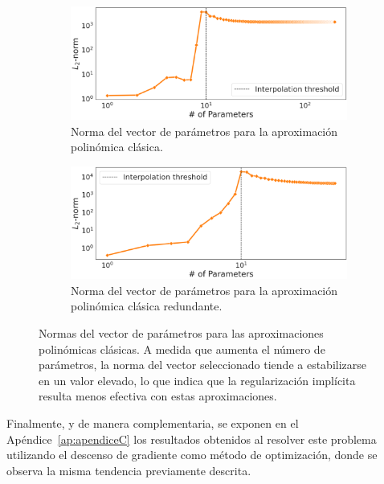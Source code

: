 \begin{figure}[h]
    \centering
    \begin{subfigure}[b]{0.48\textwidth}
        \centering
        \includegraphics[width=\textwidth]{img/experiments/OLS1.4.png}
        \caption{Norma del vector de parámetros para la aproximación polinómica clásica.}\label{fig:OLS1.4DDD}
    \end{subfigure}
    \hfill
    \begin{subfigure}[b]{0.48\textwidth}
        \centering
        \includegraphics[width=\textwidth]{img/experiments/Redundant1.4.png}
        \caption{Norma del vector de parámetros para la aproximación polinómica clásica redundante.}\label{fig:Redundant1.4DDD}
    \end{subfigure}
    \caption[Normas del vector de parámetros para las aproximaciones polinómicas clásicas.]{Normas del vector de parámetros para las aproximaciones polinómicas clásicas. A medida que aumenta el número de parámetros, la norma del vector seleccionado tiende a estabilizarse en un valor elevado, lo que indica que la regularización implícita resulta menos efectiva con estas aproximaciones.}\label{fig:normas-clasicas}
\end{figure}

Finalmente, y de manera complementaria, se exponen en el Apéndice~\ref{ap:apendiceC} los resultados obtenidos al resolver este problema utilizando el descenso de gradiente como método de optimización, donde se observa la misma tendencia previamente descrita.

